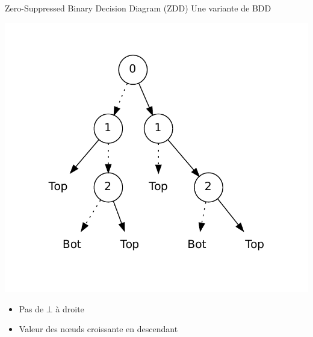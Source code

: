 \documentclass{beamer}
\begin{document}
\begin{frame}{Zero-Suppressed Binary Decision Diagram (ZDD)}
Une variante de BDD\\

\begin{center}
\includegraphics[scale=0.3]{../imports/zdd_ex.pdf}
\end{center}
\begin{itemize}
\item Pas de $\bot$ à droite
\item Valeur des n\oe uds croissante en descendant
\end{itemize} 
\end{frame}
\end{document}
